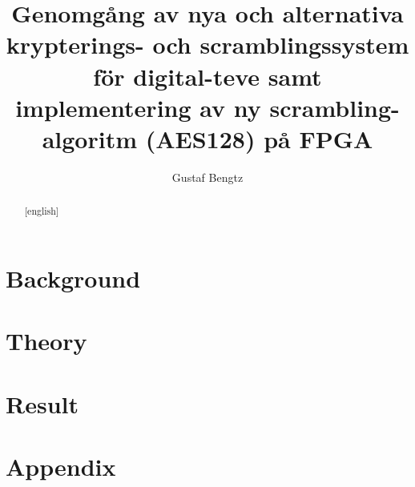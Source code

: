 \documentclass[
  utf8,%
  parskip,%
  largesmallcaps,intlimits,widermath,%
  sharecounter,nobreak,definition=marks,%
  noparts %
]{rtthesis}
\begin{document}
\makeFrontPage
\frontmatter
\title{Genomgång av nya och alternativa krypterings- och scramblingssystem för 
  digital-teve samt implementering av ny scrambling-algoritm (AES128) på FPGA}
\author{Gustaf Bengtz}
\maketitle
\makeLibraryPage{}



\begin{abstract}[english]
  
\end{abstract}


\tableofcontents
\mainmatter

\part{Background}


\part{Theory}






\part{Result}


\part{Appendix}
\appendix





\begin{footnotesize}

\end{footnotesize}

\backmatter

\listoffigures


\printindex
\end{document}
